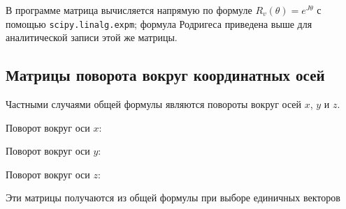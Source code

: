 \documentclass[a4paper,14pt]{extarticle}
\begin{document}
В программе матрица вычисляется напрямую по формуле $R_v(\theta)=e^{J\theta}$ с помощью \texttt{scipy.linalg.expm}; формула Родригеса приведена выше для аналитической записи этой же матрицы.

\subsection*{Матрицы поворота вокруг координатных осей}

Частными случаями общей формулы являются повороты вокруг осей $x$, $y$ и $z$.

Поворот вокруг оси $x$:

\begin{center}\end{center}

Поворот вокруг оси $y$:

\begin{center}\end{center}

Поворот вокруг оси $z$:

\begin{center}\end{center}

Эти матрицы получаются из общей формулы при выборе единичных векторов

\begin{center}\end{center}
\end{document}
